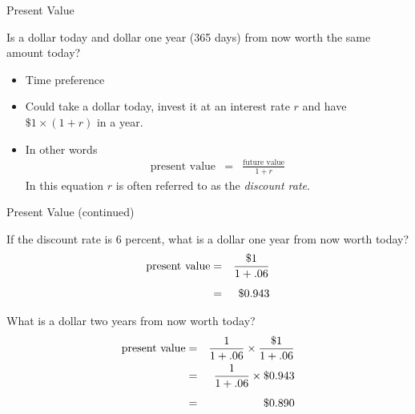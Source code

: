 \documentclass[professionalfonts,small]{beamer}
\newcommand{\STRUT}{\rule{0in}{3ex}}
\begin{document}
\begin{frame}{Present Value}

Is a dollar today and dollar one year (365 days) from now worth the same amount today?
\begin{itemize}
\item Time preference

\item Could take a dollar today, invest it at an interest rate $r$ and have $\$1 \times (1+r)$ in a year.

\item In other words
\begin{eqnarray*}
\mbox{present value}  &=& \frac{\mbox{future value}}{1+r}
\end{eqnarray*}
In this equation $r$ is often referred to as the {\em discount rate}.

\end{itemize}
\end{frame}

\begin{frame}{Present Value (continued)}

If the discount rate is 6 percent, what is a dollar one year from now worth today?
\begin{eqnarray*}
\mbox{present value}  &=& \frac{\$1}{1+.06}  \\
                      &=&  \$0.943 \STRUT
\end{eqnarray*}

\medskip

What is a dollar two years from now worth today?
\begin{eqnarray*}
\mbox{present value}  &=& \frac{1}{1+.06} \times \frac{\$1}{1+.06}  \\
                      &=&  \frac{1}{1+.06} \times \$0.943 \STRUT \\
                      &=&  \$0.890 \STRUT
\end{eqnarray*}



\end{frame}
\end{document}
